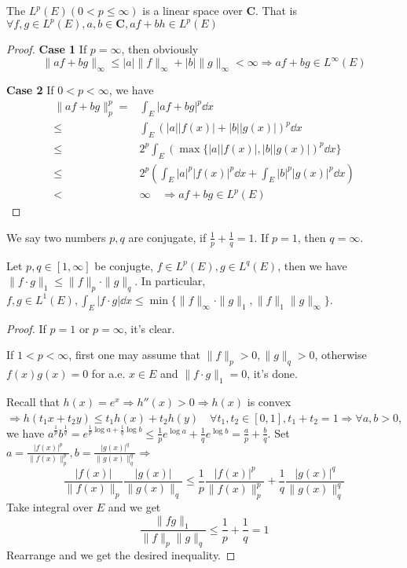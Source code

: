 \documentclass{article}
\begin{document}
\begin{Thm}
The $L^p(E)(0<p\leq\infty)$ is a linear space over $\mathbf{C}$. That is $\forall f,g\in L^p(E),a,b\in\mathbf{C},af+bh\in L^p(E)$
\end{Thm}
\begin{proof}
\textbf{Case 1} If $p=\infty$, then obviously \[\|af+bg\|_\infty\leq |a|\|f\|_\infty+|b|\|g\|_\infty<\infty\Rightarrow af+bg\in L^\infty(E)\]

\textbf{Case 2} If $0<p<\infty$, we have 
\[\begin{aligned}
\|af+bg\|_p^p=&\int_E|af+bg|^p\dd x\\
\leq &\int_E(|a||f(x)|+|b||g(x)|)^p\dd x\\
\leq  &2^p\int_E(\max\{|a||f(x)|,|b||g(x)|)^{p}\dd x\}\\
\leq &2^p(\int_E|a|^p|f(x)|^p\dd x+\int_E |b|^p|g(x)|^p\dd x)\\
<&\infty\quad\Rightarrow af+bg\in L^p(E)
\end{aligned}\]
\end{proof}

\begin{Def}
We say two numbers $p,q$ are conjugate, if $\frac 1 p+\frac 1 q=1$. If $p=1$, then $q=\infty$.
\end{Def}

\begin{Thm}
Let $p,q\in [1,\infty]$ be conjugte, $f\in L^p(E),g\in L^q(E)$, then we have $\|f\cdot g\|_1\leq \|f\|_p\cdot \|g\|_q$. In particular, $f,g\in L^1(E),\int_E|f\cdot g|\dd x\leq\min\{\|f\|_\infty\cdot \|g\|_1,\|f\|_1\|g\|_\infty\}$.
\end{Thm}

\begin{proof}
If $p=1$ or $p=\infty$, it's clear.

If $1<p<\infty$, first one may assume that $\|f\|_p>0,\|g\|_q>0$, otherwise $f(x)g(x)=0$ for a.e. $x\in E$ and $\|f\cdot g\|_1=0$, it's done.

Recall that $h(x)=e^x\Rightarrow h''(x)>0\Rightarrow h(x)$ is convex$\Rightarrow h(t_1x+t_2y)\leq t_1h(x)+t_2h(y)\quad\forall t_1,t_2\in[0,1], t_1+t_2=1\Rightarrow\forall a,b>0$, we have $a^{\frac 1 p}b^{\frac 1 q}=e^{\frac{1}{p}\log a+\frac{1}{q}\log b}\leq \frac 1 pe^{\log a}+\frac 1 q e^{\log b}=\frac a p+\frac b q$. Set $a=\frac{|f(x)|^p}{\|f(x)\|_p^p},b=\frac{|g(x)|^q}{\|g(x)\|^q_q}\Rightarrow$
\[\frac{|f(x)|}{\|f(x)\|_p}\frac{|g(x)|}{\|g(x)\|_q}\leq \frac 1 p\frac{|f(x)|^p}{\|f(x)\|^p_p}+\frac 1 q\frac{|g(x)|^q}{\|g(x)\|^q_q}\]
Take integral over $E$ and we get 
\[\frac{\|fg\|_1}{\|f\|_p\|g\|_q}\leq \frac 1 p+\frac 1 q=1\]
Rearrange and we get the desired inequality.
\end{proof}
\end{document}

